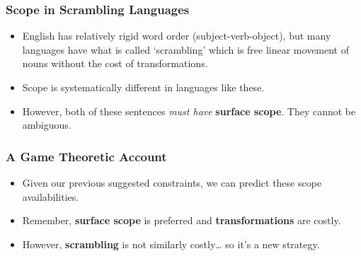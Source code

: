 \documentclass{beamer}
\begin{document}
\begin{frame}
\frametitle{Scope in Scrambling Languages}\pause
\begin{itemize}
\item English has relatively rigid word order (subject-verb-object), but many languages have what is called `scrambling' which is free linear movement of nouns without the cost of transformations.\pause
\item Scope is systematically different in languages like these.\pause
\end{itemize}
\begin{exe}
\pause
{}
\end{exe}\pause
\begin{itemize}
\item However, both of these sentences \emph{must have} \textbf{surface scope}. They cannot be ambiguous.
\end{itemize}
\end{frame}

\begin{frame}
\frametitle{A Game Theoretic Account}\pause
\begin{itemize}
    \item Given our previous suggested constraints, we can predict these scope availabilities.\pause
    \item Remember, \textbf{surface scope} is preferred and \textbf{transformations} are costly.\pause
    \item However, \textbf{scrambling} is not similarly costly{\ldots} so it's a new strategy.
\end{itemize}
\end{frame}
\end{document}
